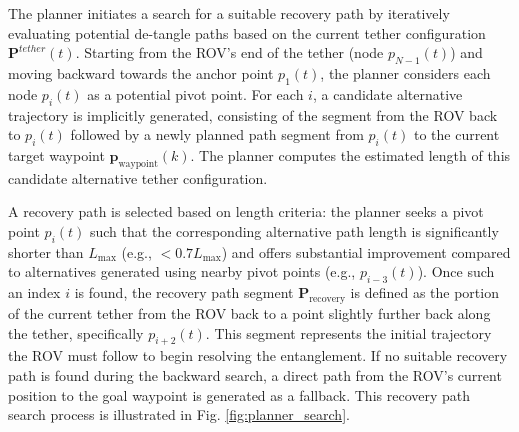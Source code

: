 The planner initiates a search for a suitable recovery path by iteratively evaluating potential de-tangle paths based on the current tether configuration \( \mathbf{P}^{tether}(t) \). Starting from the \ac{ROV}'s end of the tether (node \( p_{N-1}(t) \)) and moving backward towards the anchor point \( p_1(t) \), the planner considers each node \( p_i(t) \) as a potential pivot point. For each \( i \), a candidate alternative trajectory is implicitly generated, consisting of the segment from the \ac{ROV} back to \( p_i(t) \) followed by a newly planned path segment from \( p_i(t) \) to the current target waypoint \( \mathbf{p}_{\text{waypoint}}(k) \). The planner computes the estimated length of this candidate alternative tether configuration.

A recovery path is selected based on length criteria: the planner seeks a pivot point \( p_i(t) \) such that the corresponding alternative path length is significantly shorter than \( L_{\text{max}} \) (e.g., \( < 0.7 L_{\text{max}} \)) and offers substantial improvement compared to alternatives generated using nearby pivot points (e.g., \( p_{i-3}(t) \)). Once such an index \( i \) is found, the recovery path segment \( \mathbf{P}_{\text{recovery}} \) is defined as the portion of the current tether from the \ac{ROV} back to a point slightly further back along the tether, specifically \( p_{i+2}(t) \). This segment represents the initial trajectory the \ac{ROV} must follow to begin resolving the entanglement. If no suitable recovery path is found during the backward search, a direct path from the \ac{ROV}'s current position to the goal waypoint is generated as a fallback. This recovery path search process is illustrated in Fig. \ref{fig:planner_search}.  











